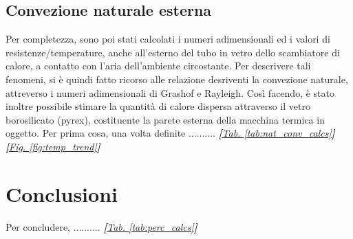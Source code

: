 \documentclass[a4paper,10pt]{article}                                                                                       %
\begin{document}
\subsection{Convezione naturale esterna}                                                                                    %
\label{subsec:extnat_conv}                                                                                                  %
  Per completezza, sono poi stati calcolati i numeri adimensionali ed i valori di resistenze/temperature, anche all'esterno
  del tubo in vetro dello scambiatore di calore, a contatto con l'aria dell'ambiente circostante. Per descrivere tali
  fenomeni, si è quindi fatto ricorso alle relazione desriventi la convezione naturale, attreverso i numeri adimensionali
  di Grashof e Rayleigh. Così facendo, è stato inoltre possibile stimare la quantità di calore dispersa attraverso il vetro
  borosilicato (pyrex), costituente la parete esterna della macchina termica in oggetto. Per prima cosa, una volta definite
  ..........
  \textit{\textbf{[}\hyperref[tab:nat_conv_calcs]{Tab. }\ref{tab:nat_conv_calcs}\textbf{]}}
  \textit{\textbf{[}\hyperref[fig:temp_trend]{Fig. }\ref{fig:temp_trend}\textbf{]}}

\section{Conclusioni}                                                                                                       %
\label{sec:conclusions}                                                                                                     %
  Per concludere, ..........
  \textit{\textbf{[}\hyperref[tab:perc_calcs]{Tab. }\ref{tab:perc_calcs}\textbf{]}}
\end{document}
